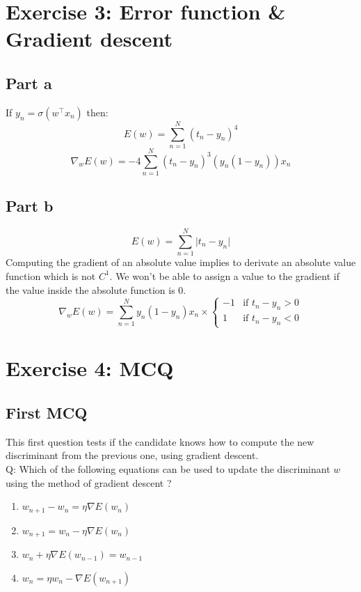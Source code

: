 \documentclass[a4paper, 10pt]{article}
\begin{document}
\section{Exercise 3: Error function \& Gradient descent}
\subsection{Part a}
If $y_n = \sigma(w^\top x_n)$ then:
$$
E(w) = \sum_{n=1}^N (t_n-y_n)^4
$$
$$
\nabla_w E(w) = -4\sum_{n=1}^N (t_n-y_n)^3(y_n (1-y_n))x_n
$$

\subsection{Part b}
$$
E(w) = \sum_{n=1}^N \vert t_n - y_n \vert
$$
Computing the gradient of an absolute value implies to derivate an
absolute value function which  is not $C^1$. We won't be able to assign 
a value to the gradient if the value inside the absolute function is 0.
$$
\nabla_w E(w) = \sum_{n=1}^N y_n(1-y_n)x_n \times \left\{ \begin{array}{ll}  
                    -1 & \text{if $t_n-y_n > 0$}
                \\ 
                    1 & \text{if $t_n-y_n < 0$}
                        \end{array}
                \right.
$$

\section{Exercise 4: MCQ}
\subsection{First MCQ}
This first question tests if the candidate knows how to compute the new
discriminant from the previous one, using gradient descent.
\\
Q: Which of the following equations can be used to update the discriminant $w$ using
the method of gradient descent ?
\\
\begin{enumerate}
    \item $w_{n+1} - w_{n} =  \eta \nabla E(w_{n})$
    \item $w_{n+1} = w_{n} - \eta \nabla E(w_{n})$
    \item $w_{n} + \eta \nabla E(w_{n-1}) = w_{n-1} $
    \item $w_{n} = \eta w_{n} - \nabla E(w_{n+1})$
\end{enumerate}
\end{document}
